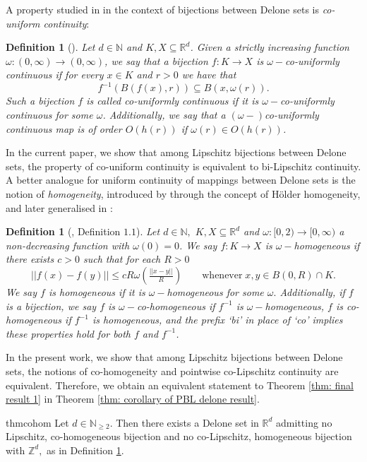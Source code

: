 \documentclass{article}
\newtheorem{define}[thm]{Definition}
\newcommand{\R}{\mathbb{R}}
\newcommand{\Z}{\mathbb{Z}}
\newcommand{\N}{\mathbb{N}}
\begin{document}
A property studied in \cite{viera2023delone} in the context of bijections between Delone sets is \emph{co-uniform continuity}: 
\begin{define}[\cite{viera2023delone}] \label{define: couniform with set}
        Let $d \in \N$ and $K,X \subseteq \R^d$. Given a strictly increasing function ${\omega:(0,\infty) \to (0,\infty)}$, we say that a bijection $f:K \to X$ is
\emph{$\omega-$co-uniformly continuous} if for every $x \in K$ and $r >0$ we have that
\begin{equation*}
    f^{-1}(B(f(x),r)) \subseteq B(x,\omega(r)).
\end{equation*}
Such a bijection $f$ is called \emph{co-uniformly continuous} if it is \emph{$\omega-$}co-uniformly continuous for some $\omega$. Additionally, we say
that a $(\omega-)$co-uniformly continuous map is of \emph{order} $O(h(r))$ if $\omega(r) \in O(h(r))$.
    \end{define}
In the current paper, we show that among Lipschitz bijections between Delone sets, the property of co-uniform continuity is equivalent to bi-Lipschitz continuity. 
A better analogue for uniform continuity of mappings between Delone sets is the notion of \emph{homogeneity}, introduced by \cite{mcmullen1998lipschitz} through the concept of H\"{o}lder homogeneity, and later generalised in \cite{dymond2023highly}:
\begin{define}[\cite{dymond2023highly}, Definition $1.1$] \label{define: co-homogeneity} Let $d\in \N,$ $K, X \subseteq \R^d$ and $\omega:[0,2) \to [0,\infty)$ a non-decreasing function with $\omega(0) = 0$. We say $f:K \to X$ is \emph{$\omega-$homogeneous} if there exists $c>0$ such that for each $R>0$
$$||f(x)-f(y)|| \leq cR\omega\left(\tfrac{||x-y||}{R}\right) \qquad \text{whenever} \; x,y \in B(0,R)\cap K.$$
We say $f$ is \emph{homogeneous} if it is $\omega-$homogeneous for some $\omega.$ Additionally, if $f$ is a bijection, we say $f$ is \emph{$\omega-$co-homogeneous} if $f^{-1}$ is $\omega-$homogeneous, $f$ is \emph{co-homogeneous} if $f^{-1}$ is homogeneous, and the prefix `bi' in place of `co' implies these properties hold for both $f$ and $f^{-1}$.
\end{define}
In the present work, we show that among Lipschitz bijections between Delone sets, the notions of co-homogeneity and pointwise co-Lipschitz continuity are equivalent. 
Therefore, we obtain an equivalent statement to Theorem \ref{thm: final result 1} in Theorem \ref{thm: corollary of PBL delone result}.

\begin{restatable}{thm}{cohom} \label{thm: corollary of PBL delone result}
    Let $d \in \N_{\geq 2}.$ Then there exists a Delone set in $\R^d$ admitting no Lipschitz, co-homogeneous bijection and no co-Lipschitz, homogeneous bijection with $\Z^d,$ as in Definition \ref{define: co-homogeneity}.
\end{restatable}
\end{document}
